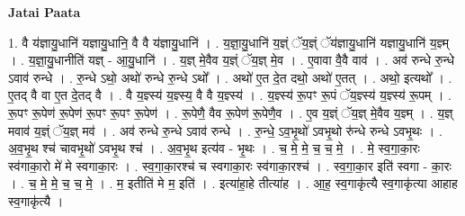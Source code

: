 \documentclass[17pt]{extarticle}
\begin{document}
\textbf{Jatai Paata} \newline

1. वै य॑ज्ञायु॒धानि॑ यज्ञायु॒धानि॒ वै वै य॑ज्ञायु॒धानि॑ । . य॒ज्ञा॒यु॒धानि॑ य॒ज्ञ्ं ॅय॒ज्ञ्ं ॅय॑ज्ञायु॒धानि॑ यज्ञायु॒धानि॑ य॒ज्ञ्म् । . य॒ज्ञा॒यु॒धानीति॑ यज्ञ् - आ॒यु॒धानि॑ । . य॒ज्ञ् मे॒वैव य॒ज्ञ्ं ॅय॒ज्ञ् मे॒व । . ए॒वावा वै॒वै वाव॑ । . अव॑ रुन्धे रु॒न्धे ऽवाव॑ रुन्धे । . रु॒न्धे ऽथो॒ अथो॑ रुन्धे रु॒न्धे ऽथो᳚ । . अथो॑ ए॒त दे॒त दथो॒ अथो॑ ए॒तत् । . अथो॒ इत्यथो᳚ । . ए॒तद् वै वा ए॒त दे॒तद् वै । . वै य॒ज्ञ्स्य॑ य॒ज्ञ्स्य॒ वै वै य॒ज्ञ्स्य॑ । . य॒ज्ञ्स्य॑ रू॒पꣳ रू॒पं ॅय॒ज्ञ्स्य॑ य॒ज्ञ्स्य॑ रू॒पम् । . रू॒पꣳ रू॒पेण॑ रू॒पेण॑ रू॒पꣳ रू॒पꣳ रू॒पेण॑ । . रू॒पेणै॒ वैव रू॒पेण॑ रू॒पेणै॒व । . ए॒व य॒ज्ञ्ं ॅय॒ज्ञ् मे॒वैव य॒ज्ञ्म् । . य॒ज्ञ् मवाव॑ य॒ज्ञ्ं ॅय॒ज्ञ् मव॑ । . अव॑ रुन्धे रु॒न्धे ऽवाव॑ रुन्धे । . रु॒न्धे॒ ऽव॒भृ॒थो॑ ऽवभृ॒थो रु॑न्धे रुन्धे ऽवभृ॒थः । . अ॒व॒भृ॒थ श्च॑ चावभृ॒थो॑ ऽवभृ॒थ श्च॑ । . अ॒व॒भृ॒थ इत्य॑व - भृ॒थः । . च॒ मे॒ मे॒ च॒ च॒ मे॒ । . मे॒ स्व॒गा॒का॒रः स्व॑गाका॒रो मे॑ मे स्वगाका॒रः । . स्व॒गा॒का॒रश्च॑ च स्वगाका॒रः स्व॑गाका॒रश्च॑ । . स्व॒गा॒का॒र इति॑ स्वगा - का॒रः । . च॒ मे॒ मे॒ च॒ च॒ मे॒ । . म॒ इतीति॑ मे म॒ इति॑ । . इत्या॑हा॒हे तीत्या॑ह । . आ॒ह॒ स्व॒गाकृ॑त्यै स्व॒गाकृ॑त्या आहाह स्व॒गाकृ॑त्यै । \newline
\end{document}
